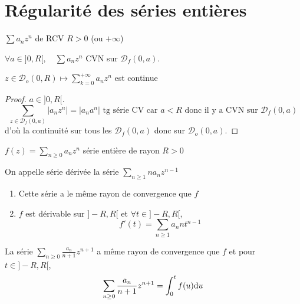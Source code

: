 \section{Régularité des séries entières}

\begin{prop}
    \Hyp $\sum a_nz^n$ de RCV $R>0$ (ou $+\infty$)
    \begin{concenum}
    \item $\forall a\in ]0, R[, \quad \sum a_nz^n$ CVN sur $\mathcal D_f(0, a)$.
    \item $z\in\mathcal D_o(0, R)\longmapsto\displaystyle \sum_{k=0}^{+\infty}a_nz^n$ est continue
    \end{concenum}
\end{prop}

\begin{proof}
    $a\in]0, R[$. \[
        \sum_{z\in\mathcal D_f(0, a)}|a_nz^n|=|a_na^n|\text{ tg série CV car } a<R \text{ donc il y a CVN sur }\mathcal D_f(0, a)
    \]
    d'où la continuité sur tous les $\mathcal D_f(0, a)$ donc sur $\mathcal D_o(0, a)$.
\end{proof}

\begin{thm}
    \Hyp $f(z)=\sum_{n\geq 0}a_nz^n$ série entière de rayon $R>0$
    \begin{concenum}
    \item On appelle série dérivée la série $\sum_{n\geq 1}na_nz^{n-1}$
        \begin{enumerate}
            \item Cette série a le même rayon de convergence que $f$
            \item $f$ est dérivable sur $]-R, R[$ et $\forall t\in ]-R, R[,$ \[
                    f'(t)=\sum_{n\geq 1}a_nnt^{n-1}
                \]
        \end{enumerate}
        \item La série $\sum_{n\geq 0}\frac{a_n}{n+1}z^{n+1}$ a même rayon de convergence que $f$ et pour $t\in ]-R, R[$, \[
            \sum_{n\geq 0}\frac{a_n}{n+1}z^{n+1}=\int_0^tf(u)\mathrm{d} u
            \]
    \end{concenum}
\end{thm}


